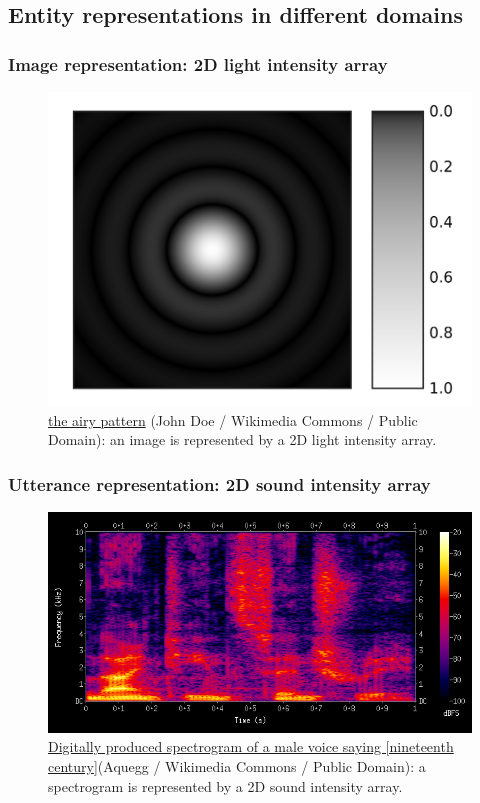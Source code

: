 \documentclass{article}
\begin{document}
\subsection{Entity representations in different domains}

\subsubsection{Image representation: 2D light intensity array}
\begin{figure}[H]
	\centering
	\includegraphics[width=0.5\linewidth]{Airy-pattern}
	\caption{\href{https://commons.wikimedia.org/wiki/File:Airy-pattern.svg}{the
	 airy pattern} (John Doe / Wikimedia Commons / Public Domain): an image is 
	represented by a 2D light intensity array.}
	\label{fig:Airy-pattern}
\end{figure}
\subsubsection{Utterance representation: 2D sound intensity array}
\begin{figure}[H]
	\centering
	\includegraphics[width=\linewidth]{Spectrogram-19thC}
	\caption{\href{https://commons.wikimedia.org/wiki/File:Spectrogram-19thC.png}{Digitally
	 produced spectrogram of a male voice saying [nineteenth century]}(Aquegg / 
	Wikimedia Commons / Public Domain): a spectrogram is represented by a 2D 
	sound intensity array.}
	\label{fig:Spectrogram-19thC}
\end{figure}
\end{document}
